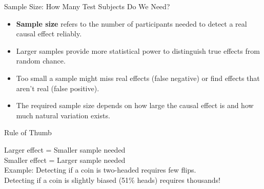 \documentclass{beamer}
\begin{document}
	\begin{frame}{Sample Size: How Many Test Subjects Do We Need?}
		\begin{itemize}
			\item \textbf{Sample size} refers to the number of participants needed to detect a real causal effect reliably.
			\item Larger samples provide more statistical power to distinguish true effects from random chance.
			\item Too small a sample might miss real effects (false negative) or find effects that aren't real (false positive).
			\item The required sample size depends on how large the causal effect is and how much natural variation exists.
		\end{itemize}
		
		\begin{block}{Rule of Thumb}
			\begin{center}
				Larger effect = Smaller sample needed\\
				Smaller effect = Larger sample needed\\
				\vspace{0.2cm}
				Example: Detecting if a coin is two-headed requires few flips.\\
				Detecting if a coin is slightly biased (51\% heads) requires thousands!
			\end{center}
		\end{block}
	\end{frame}
	
\end{document}
